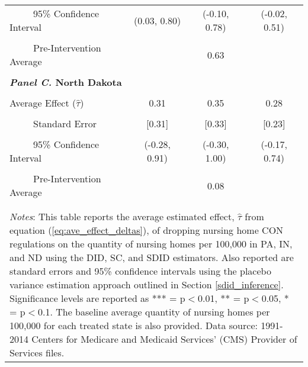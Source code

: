 \documentclass[../Main.tex]{subfiles}
\begin{document}
\begin{table}[htbp]
\begin{tabular}{l*{3}{c}}
\\[-2ex]
\multicolumn{1}{l}{\ \ \ \ \ 95\% Confidence Interval}&   \multicolumn{1}{c}{(0.03, 0.80)}&   \multicolumn{1}{c}{(-0.10, 0.78)}&   \multicolumn{1}{c}{(-0.02, 0.51)}\\
\\[-2ex]
\multicolumn{1}{l}{\ \ \ \ \ Pre-Intervention Average}&   \multicolumn{3}{c}{0.63}\\
\\[-.1ex]
\multicolumn{4}{l}{\textbf{\textit{Panel C.} North Dakota}}\\
\\[-1.5ex]
\multicolumn{1}{l}{Average Effect ($\hat{\tau}$)}&   \multicolumn{1}{c}{0.31}&   \multicolumn{1}{c}{0.35}&  \multicolumn{1}{c}{0.28}\\
\\[-2ex]
\multicolumn{1}{l}{\ \ \ \ \ Standard Error}  &\multicolumn{1}{c}{[0.31]}&\multicolumn{1}{c}{[0.33]}&\multicolumn{1}{c}{[0.23]}\\
\\[-2ex]
\multicolumn{1}{l}{\ \ \ \ \ 95\% Confidence Interval}&   \multicolumn{1}{c}{(-0.28, 0.91)}&   \multicolumn{1}{c}{(-0.30, 1.00)}&   \multicolumn{1}{c}{(-0.17, 0.74)}\\
\\[-2ex]
\multicolumn{1}{l}{\ \ \ \ \ Pre-Intervention Average}&   \multicolumn{3}{c}{0.08}\\
\\[-.1ex]
\hline\hline
\\[-2ex]
\multicolumn{4}{p{.75\linewidth}}{\footnotesize \textit{Notes}: This table reports the average estimated effect, $\hat{\tau}$ from equation (\ref{eq:ave_effect_deltas}), of dropping nursing home CON regulations on the quantity of nursing homes per 100,000 in PA, IN, and ND using the DID, SC, and SDID estimators. Also reported are standard errors and 95\% confidence intervals using the placebo variance estimation approach outlined in Section \ref{sdid_inference}. Significance levels are reported as *** = p$<$0.01, ** = p$<$0.05, * = p$<$0.1. The baseline average quantity of nursing homes per 100,000 for each treated state is also provided. Data source: 1991-2014 Centers for Medicare and Medicaid Services’ (CMS) Provider of Services files.}
\end{tabular}
\end{table}
\vfill
\clearpage
\end{document}
